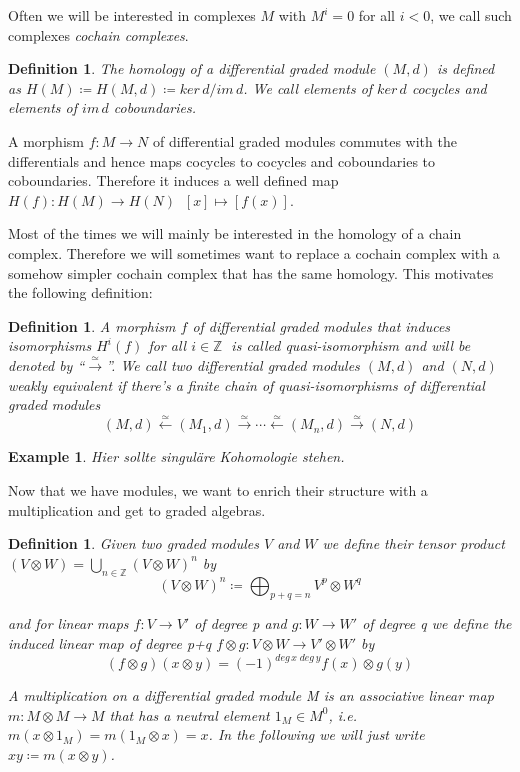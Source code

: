 \documentclass[12pt,a4paper]{scrartcl}
\newtheorem{Definition}[Theorem]{Definition}
\newtheorem{Example}[Theorem]{Example}
\numberwithin{equation}{section}
\newcommand{\Z}{\mathbb{Z}} %
\begin{document}
Often we will be interested in complexes $M$ with $M^i = 0$ for all $i < 0$, we call such complexes \emph{cochain complexes}.
\begin{Definition}
The \emph{homology} of a differential graded module $(M,d)$ is defined as \newline ${H(M) \coloneqq 
H(M,d) \coloneqq ker \, d / im \, d}$.
We call elements of $ker \, d$ \emph{cocycles} and elements of $im \, d$ \emph{coboundaries}.
\end{Definition}

A morphism $f \colon M \to N$ of differential graded modules commutes with the differentials and hence maps cocycles to cocycles
and coboundaries to coboundaries. Therefore it induces a well defined map $H(f) \colon H(M) \to H(N) \; \; [x] \mapsto [f(x)]$. 

Most of the times we will mainly be interested in the homology of a chain complex. Therefore we will sometimes want to replace
a cochain complex with a somehow simpler cochain complex that has the same homology. This motivates the following definition:

\begin{Definition}
 A morphism $f$ of differential graded modules that induces isomorphisms $H^i(f)$ for all $i \in \Z \;$ is called \emph{quasi-isomorphism} and will
 be denoted by ``$\overset{\simeq}{\longrightarrow}$''. \newline
 We call two differential graded modules $(M,d)$ and $(N,d)$ \emph{weakly equivalent} if there's a finite chain of quasi-isomorphisms of differential
 graded modules
 $$ (M,d) \overset{\simeq}{\leftarrow} (M_1,d) \overset{\simeq}{\rightarrow} \cdots 
 \overset{\simeq}{\leftarrow} (M_n,d) \overset{\simeq}{\rightarrow} (N,d)$$
\end{Definition}

\begin{Example}
 Hier sollte singuläre Kohomologie stehen.
\end{Example}

Now that we have modules, we want to enrich their structure with a multiplication and get to graded algebras.

\begin{Definition}
 Given two graded modules $V$ and $W$ we define their \emph{tensor product} \newline
 ${(V \otimes W) = \bigcup_{n \in \Z} (V \otimes W)^n }$ by 
 $$ (V \otimes W)^n \coloneqq \bigoplus_{p + q = n} V^p \otimes W^q$$
 
 and for linear maps $f \colon V \to V'$ of degree p and $g \colon W \to W'$ of degree q we define the induced linear map
 of degree p+q \;  ${f \otimes g \colon V \otimes W \to V' \otimes W'}$ by
 $$ (f \otimes g) ( x \otimes y) = (-1)^{deg \, x \; deg \,y} f(x) \otimes g(y) $$

 A multiplication on a differential graded module M is an associative linear map \newline
 ${m \colon M \otimes M \to M }$ that has a neutral element $1_M \in M^0$, i.e. $m(x \otimes 1_M) = m(1_M \otimes x) = x$.
 In the following we will just write $xy \coloneqq m(x \otimes y)$.
 \end{Definition}
\end{document}
